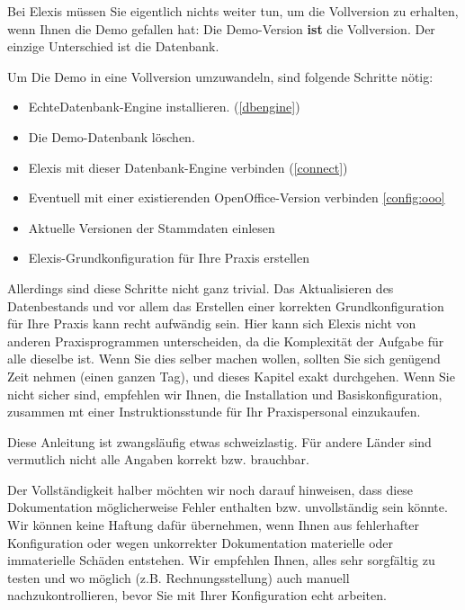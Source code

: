 
\label{vollversion}
Bei Elexis müssen Sie eigentlich nichts weiter tun, um die Vollversion zu
erhalten, wenn Ihnen die Demo gefallen hat: Die Demo-Version \textbf{ist} die
Vollversion. Der einzige Unterschied ist die Datenbank.

Um Die Demo in eine Vollversion umzuwandeln, sind folgende Schritte nötig:
\begin{itemize}
  \item \glqq Echte\grqq{}Datenbank-Engine installieren. (\ref{dbengine})
  \item Die Demo-Datenbank löschen.
  \item Elexis mit dieser Datenbank-Engine verbinden (\ref{connect})
  \item Eventuell mit einer existierenden OpenOffice-Version verbinden \ref{config:ooo}
  \item Aktuelle Versionen der Stammdaten einlesen
  \item Elexis-Grundkonfiguration für Ihre Praxis erstellen
\end{itemize}
Allerdings sind diese Schritte nicht ganz trivial. Das Aktualisieren des
Datenbestands und vor allem das Erstellen einer korrekten Grundkonfiguration für
Ihre Praxis kann recht aufwändig sein. Hier kann sich Elexis nicht von anderen
Praxisprogrammen unterscheiden, da die Komplexität der Aufgabe für alle dieselbe
ist.
Wenn Sie dies selber machen wollen, sollten Sie sich genügend Zeit nehmen (einen
ganzen Tag), und dieses Kapitel exakt durchgehen. Wenn Sie nicht sicher sind,
empfehlen wir Ihnen, die Installation und Basiskonfiguration, zusammen mt einer
Instruktionsstunde für Ihr Praxispersonal einzukaufen.\par
Diese Anleitung ist zwangsläufig etwas schweizlastig. Für andere Länder sind vermutlich nicht alle Angaben korrekt bzw. brauchbar.
\bigskip

Der Vollständigkeit halber möchten wir noch darauf hinweisen, dass diese Dokumentation möglicherweise Fehler enthalten bzw. unvollständig sein könnte. Wir können keine Haftung dafür übernehmen, wenn Ihnen aus fehlerhafter Konfiguration oder wegen unkorrekter Dokumentation materielle oder immaterielle Schäden entstehen. Wir empfehlen Ihnen, alles sehr sorgfältig zu testen und wo möglich (z.B. Rechnungsstellung) auch manuell nachzukontrollieren, bevor Sie mit Ihrer Konfiguration \glqq echt\grqq{} arbeiten.

